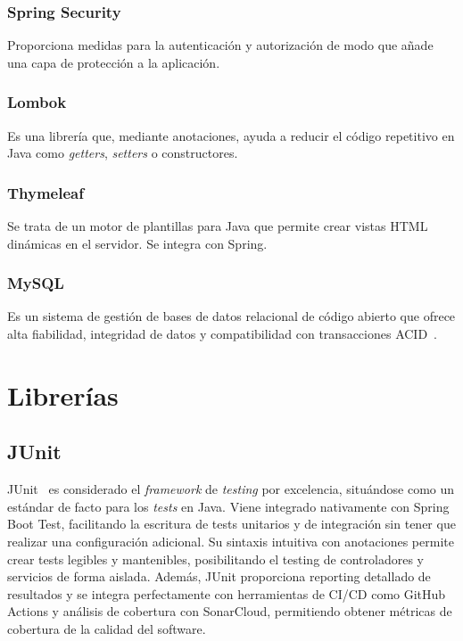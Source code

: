 \subsubsection{Spring Security~\cite{spring-security}}
Proporciona medidas para la autenticación y autorización de modo que añade una capa de protección a la aplicación.

\subsubsection{Lombok~\cite{lombok}}
Es una librería que, mediante anotaciones, ayuda a reducir el código repetitivo en Java como \emph{getters}, \emph{setters} o constructores.

\subsubsection{Thymeleaf~\cite{thymeleaf}}
Se trata de un motor de plantillas para Java que permite crear vistas HTML dinámicas en el servidor. Se integra con Spring.

\subsubsection{MySQL~\cite{mysql}}
Es un sistema de gestión de bases de datos relacional de código abierto que ofrece alta fiabilidad, integridad de datos y compatibilidad con transacciones ACID~\cite{acid}.

\section{Librerías}\label{librerias}

\subsection{JUnit}\label{junit}
JUnit~\cite{junit} es considerado el \emph{framework} de \emph{testing} por excelencia, situándose como un estándar de facto para los \emph{tests} en Java. Viene integrado nativamente con Spring Boot Test, facilitando la escritura de tests unitarios y de integración sin tener que realizar una configuración adicional. Su sintaxis intuitiva con anotaciones permite crear tests legibles y mantenibles, posibilitando el testing de controladores y servicios de forma aislada. Además, JUnit proporciona reporting detallado de resultados y se integra perfectamente con herramientas de CI/CD como GitHub Actions y análisis de cobertura con SonarCloud, permitiendo obtener métricas de cobertura de la calidad del software.

